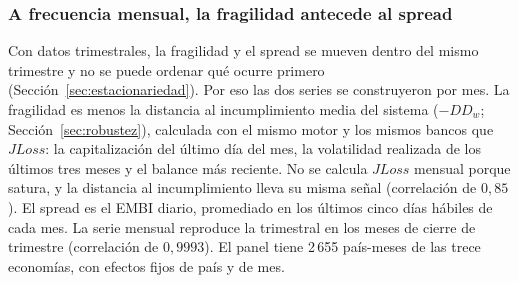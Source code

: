 \subsubsection{A frecuencia mensual, la fragilidad antecede al spread}
\label{sec:mensual}

Con datos trimestrales, la fragilidad y el spread se mueven dentro del mismo trimestre y no se puede ordenar qué ocurre primero (Sección~\ref{sec:estacionariedad}). Por eso las dos series se construyeron por mes. La fragilidad es menos la distancia al incumplimiento media del sistema ($-DD_w$; Sección~\ref{sec:robustez}), calculada con el mismo motor y los mismos bancos que $JLoss$: la capitalización del último día del mes, la volatilidad realizada de los últimos tres meses y el balance más reciente. No se calcula $JLoss$ mensual porque satura, y la distancia al incumplimiento lleva su misma señal (correlación de $0{,}85$). El spread es el EMBI diario, promediado en los últimos cinco días hábiles de cada mes. La serie mensual reproduce la trimestral en los meses de cierre de trimestre (correlación de $0{,}9993$). El panel tiene 2\,655 país-meses de las trece economías, con efectos fijos de país y de mes.

